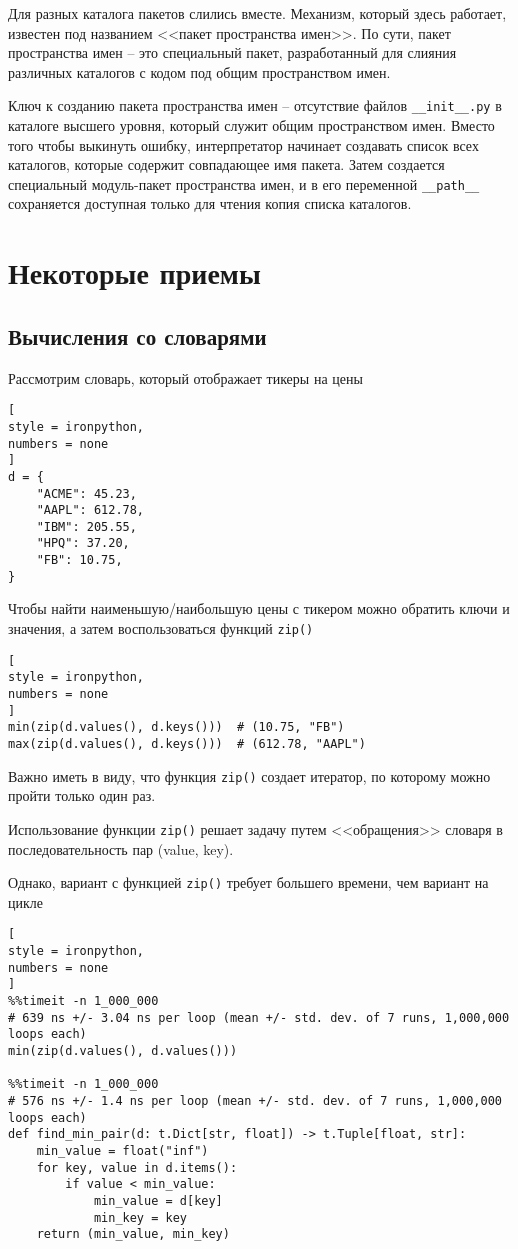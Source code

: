 \documentclass[%
	11pt,
	a4paper,
	utf8,
		]{article}
\begin{document}
Для разных каталога пакетов слились вместе. Механизм, который здесь работает, известен под названием <<пакет пространства имен>>. По сути, пакет пространства имен -- это специальный пакет, разработанный для слияния различных каталогов с кодом под общим пространством имен.

Ключ к созданию пакета пространства имен -- отсутствие файлов \verb|__init__.py| в каталоге высшего уровня, который служит общим пространством имен. Вместо того чтобы выкинуть ошибку, интерпретатор начинает создавать список всех каталогов, которые содержит совпадающее имя пакета. Затем создается специальный модуль-пакет пространства имен, и в его переменной \verb|__path__| сохраняется доступная только для чтения копия списка каталогов.





\section{Некоторые приемы}

\subsection{Вычисления со словарями}

Рассмотрим словарь, который отображает тикеры на цены
\begin{lstlisting}[
style = ironpython,
numbers = none
]
d = {
    "ACME": 45.23,
    "AAPL": 612.78,
    "IBM": 205.55,
    "HPQ": 37.20,
    "FB": 10.75,
}
\end{lstlisting}

Чтобы найти наименьшую/наибольшую цены с тикером можно обратить ключи и значения, а затем воспользоваться функций \texttt{zip()}
\begin{lstlisting}[
style = ironpython,
numbers = none
]
min(zip(d.values(), d.keys()))  # (10.75, "FB")
max(zip(d.values(), d.keys()))  # (612.78, "AAPL")
\end{lstlisting}

Важно иметь в виду, что функция \texttt{zip()} создает итератор, по которому можно пройти только один раз.

Использование функции \texttt{zip()} решает задачу путем <<обращения>> словаря в последовательность пар (value, key). 

Однако, вариант с функцией \texttt{zip()} требует большего времени, чем вариант на цикле
\begin{lstlisting}[
style = ironpython,
numbers = none
]
%%timeit -n 1_000_000
# 639 ns +/- 3.04 ns per loop (mean +/- std. dev. of 7 runs, 1,000,000 loops each)
min(zip(d.values(), d.values()))  

%%timeit -n 1_000_000
# 576 ns +/- 1.4 ns per loop (mean +/- std. dev. of 7 runs, 1,000,000 loops each)
def find_min_pair(d: t.Dict[str, float]) -> t.Tuple[float, str]:
    min_value = float("inf")
    for key, value in d.items():
        if value < min_value:
            min_value = d[key]
            min_key = key
    return (min_value, min_key)
\end{lstlisting} 
\end{document}
